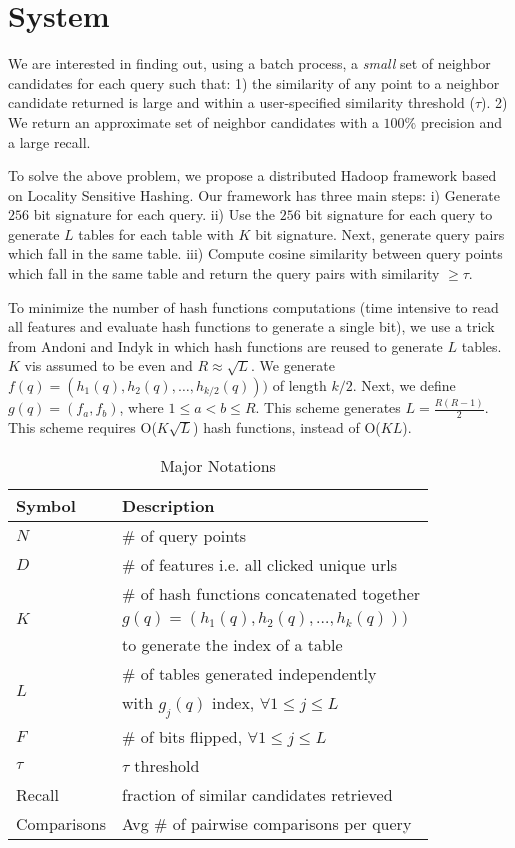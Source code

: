 
\section{System}
We are interested in finding out, using a batch process, a \emph{small} set of
neighbor candidates for each query such that: 1) the similarity of any
point to a neighbor candidate returned is large and within a user-specified 
similarity threshold ($\tau$). 2) We return an approximate set of neighbor 
candidates with a $100\%$ precision and a large recall. 

To solve the above problem, we propose a distributed Hadoop framework based on Locality Sensitive Hashing. 
Our framework has three main steps: 
i) Generate $256$ bit signature for each query.  
ii) Use the $256$ bit signature for each query to generate $L$ tables for each table with $K$ bit signature. 
Next, generate query pairs which fall in the same table.
iii) Compute cosine similarity between query points which fall in the same table and return the query pairs  
with similarity $\geq\tau$.  


To minimize the number of hash functions computations (time intensive to read all features and 
evaluate hash functions to generate a single bit), we use a trick from Andoni and Indyk  
in which hash functions are reused to generate $L$ tables. $K$ vis assumed to be even and $R \approx	\sqrt L$. 
We generate $f(q)=(h_1(q),h_2(q),\dots,h_{k/2}(q)))$ of length $k/2$. 
Next, we define $g(q)=(f_a,f_b)$, where $1\leq a < b \leq R$. This scheme generates $L= \frac{R (R -1)}{2}$. 
This scheme requires O($K  \sqrt L$) hash functions, instead of O($KL$).    

 \begin{table}
\centering
{
\small \addtolength{\tabcolsep}{-4.5pt}
\begin{tabular}{ll}
\hline
\hline
 \textbf{Symbol} &  \textbf{Description} \\
\hline 
$N$ & \# of query points \\
$D$ & \# of features i.e. all clicked unique urls \\
\hline
\multirow{3}{*}{$K$} & \# of hash functions concatenated together \\ 
   & $g(q)=(h_1(q),h_2(q),\dots,h_k(q)))$ \\ 
	 & to generate the index of a table \\
\hline
 \multirow{2}{*}{$L$} & \# of tables generated independently \\ 
	  &  with $g_j(q)$ index, $\forall 1 \leq j \leq  L$  \\
\hline
$F$ & \# of bits flipped, $\forall 1 \leq j \leq  L$   \\
$\tau$ & $\tau$ threshold \\
Recall & fraction of similar candidates retrieved \\
Comparisons & Avg \# of pairwise comparisons per query  \\
\hline 
\end{tabular}
\caption{\footnotesize{Major Notations}}
}
\label{tab:notation}
\end{table}



